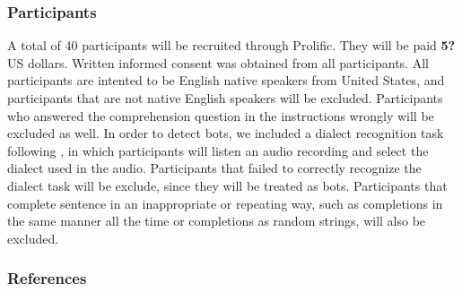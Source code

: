 \documentclass[
  10pt,
  letterpaper,
  DIV=11,
  numbers=noendperiod]{scrartcl}
\begin{document}
\hypertarget{participants}{%
\subsubsection{Participants}\label{participants}}

A total of 40 participants will be recruited through Prolific. They will
be paid \textbf{5?} US dollars. Written informed consent was obtained
from all participants. All participants are intented to be English
native speakers from United States, and participants that are not native
English speakers will be excluded. Participants who answered the
comprehension question in the instructions wrongly will be excluded as
well. In order to detect bots, we included a dialect recognition task
following \textcite{Maher2023}, in which participants will listen an
audio recording and select the dialect used in the audio. Participants
that failed to correctly recognize the dialect task will be exclude,
since they will be treated as bots. Participants that complete sentence
in an inappropriate or repeating way, such as completions in the same
manner all the time or completions as random strings, will also be
excluded.

\hypertarget{references}{%
\subsubsection{References}\label{references}}

\printbibliography[heading=none]
\end{document}
